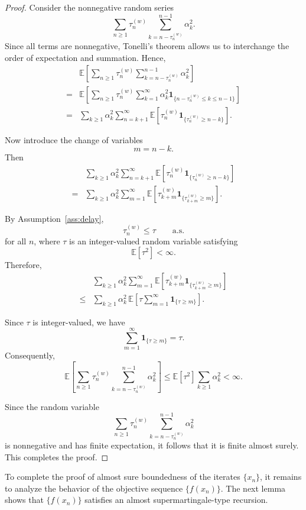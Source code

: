 \documentclass{article}
\begin{document}
\begin{proof}
Consider the nonnegative random series
\[
\sum_{n \ge 1}
\tau_n^{(w)}
\sum_{k=n-\tau_n^{(w)}}^{n-1}
\alpha_k^2  .
\]
Since all terms are nonnegative, Tonelli's theorem allows us to interchange the order of expectation and summation. Hence,
\begin{equation*}
\begin{split}
&\mathbb{E}\!\left[
\sum_{n \ge 1}
\tau_n^{(w)}
\sum_{k=n-\tau_n^{(w)}}^{n-1}
\alpha_k^2
\right]
\\
={}&
\mathbb{E}\!\left[
\sum_{n \ge 1}
\tau_n^{(w)}
\sum_{k=1}^{\infty}
\alpha_k^2
\mathbf{1}_{\{n-\tau_n^{(w)} \le k \le n-1\}}
\right]
\\
={}&
\sum_{k \ge 1}
\alpha_k^2
\sum_{n=k+1}^{\infty}
\mathbb{E}\!\left[
\tau_n^{(w)}
\mathbf{1}_{\{\tau_n^{(w)} \ge n-k\}}
\right].
\end{split}
\end{equation*}

Now introduce the change of variables
\[
m = n-k.
\]
Then
\begin{equation*}
\begin{split}
&\sum_{k \ge 1}
\alpha_k^2
\sum_{n=k+1}^{\infty}
\mathbb{E}\!\left[
\tau_n^{(w)}
\mathbf{1}_{\{\tau_n^{(w)} \ge n-k\}}
\right]
\\
={}&
\sum_{k \ge 1}
\alpha_k^2
\sum_{m=1}^{\infty}
\mathbb{E}\!\left[
\tau_{k+m}^{(w)}
\mathbf{1}_{\{\tau_{k+m}^{(w)} \ge m\}}
\right].
\end{split}
\end{equation*}

By Assumption~\ref{ass:delay},
\[
\tau_n^{(w)} \le \tau
\qquad \text{a.s.}
\]
for all $n$, where $\tau$ is an integer-valued random variable satisfying
\[
\mathbb{E}[\tau^2] < \infty.
\]
Therefore,
\begin{equation*}
\begin{split}
&\sum_{k \ge 1}
\alpha_k^2
\sum_{m=1}^{\infty}
\mathbb{E}\!\left[
\tau_{k+m}^{(w)}
\mathbf{1}_{\{\tau_{k+m}^{(w)} \ge m\}}
\right]
\\
\le{}&
\sum_{k \ge 1}
\alpha_k^2
\,
\mathbb{E}\!\left[
\tau
\sum_{m=1}^{\infty}
\mathbf{1}_{\{\tau \ge m\}}
\right].
\end{split}
\end{equation*}

Since $\tau$ is integer-valued, we have
\[
\sum_{m=1}^{\infty}
\mathbf{1}_{\{\tau \ge m\}}
=
\tau.
\]
Consequently,
\[
\mathbb{E}\!\left[
\sum_{n \ge 1}
\tau_n^{(w)}
\sum_{k=n-\tau_n^{(w)}}^{n-1}
\alpha_k^2
\right]
\le
\mathbb{E}[\tau^2]
\sum_{k \ge 1}
\alpha_k^2
<
\infty .
\]

Since the random variable
\[
\sum_{n \ge 1}
\tau_n^{(w)}
\sum_{k=n-\tau_n^{(w)}}^{n-1}
\alpha_k^2
\]
is nonnegative and has finite expectation, it follows that it is finite almost surely. This completes the proof.
\end{proof}
To complete the proof of almost sure boundedness of the iterates $\{x_n\}$, it remains to analyze the behavior of the objective sequence $\{f(x_n)\}$. The next lemma shows that $\{f(x_n)\}$ satisfies an almost supermartingale-type recursion.
\end{document}
